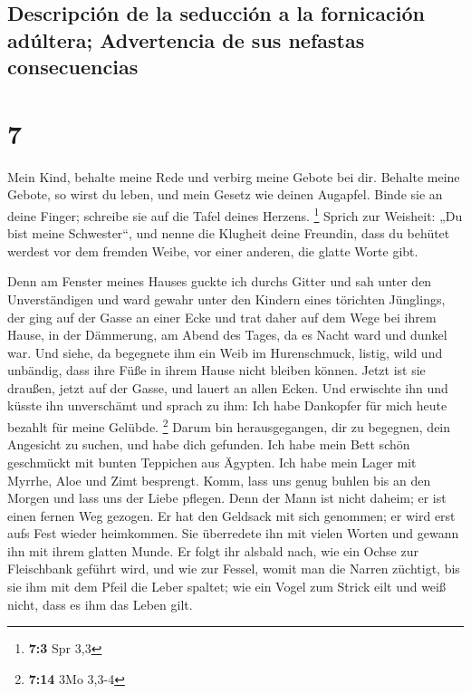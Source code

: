 \hypertarget{descripciuxf3n-de-la-seducciuxf3n-a-la-fornicaciuxf3n-aduxfaltera-advertencia-de-sus-nefastas-consecuencias}{%
\subsection{Descripción de la seducción a la fornicación adúltera;
Advertencia de sus nefastas
consecuencias}\label{descripciuxf3n-de-la-seducciuxf3n-a-la-fornicaciuxf3n-aduxfaltera-advertencia-de-sus-nefastas-consecuencias}}

\hypertarget{section-6}{%
\section{7}\label{section-6}}

 Mein Kind, behalte meine Rede und verbirg meine Gebote
bei dir.  Behalte meine Gebote, so wirst du leben, und
mein Gesetz wie deinen Augapfel.  Binde sie an deine
Finger; schreibe sie auf die Tafel deines Herzens. \footnote{\textbf{7:3}
  Spr 3,3}  Sprich zur Weisheit: „Du bist meine
Schwester``, und nenne die Klugheit deine Freundin,  dass
du behütet werdest vor dem fremden Weibe, vor einer anderen, die glatte
Worte gibt.

 Denn am Fenster meines Hauses guckte ich durchs Gitter
 und sah unter den Unverständigen und ward gewahr unter
den Kindern eines törichten Jünglings,  der ging auf der
Gasse an einer Ecke und trat daher auf dem Wege bei ihrem Hause,
 in der Dämmerung, am Abend des Tages, da es Nacht ward
und dunkel war.  Und siehe, da begegnete ihm ein Weib im
Hurenschmuck, listig,  wild und unbändig, dass ihre Füße
in ihrem Hause nicht bleiben können.  Jetzt ist sie
draußen, jetzt auf der Gasse, und lauert an allen Ecken. 
Und erwischte ihn und küsste ihn unverschämt und sprach zu ihm:
 Ich habe Dankopfer für mich heute bezahlt für meine
Gelübde. \footnote{\textbf{7:14} 3Mo 3,3-4}  Darum bin
herausgegangen, dir zu begegnen, dein Angesicht zu suchen, und habe dich
gefunden.  Ich habe mein Bett schön geschmückt mit bunten
Teppichen aus Ägypten.  Ich habe mein Lager mit Myrrhe,
Aloe und Zimt besprengt.  Komm, lass uns genug buhlen bis
an den Morgen und lass uns der Liebe pflegen.  Denn der
Mann ist nicht daheim; er ist einen fernen Weg gezogen. 
Er hat den Geldsack mit sich genommen; er wird erst aufs Fest wieder
heimkommen.  Sie überredete ihn mit vielen Worten und
gewann ihn mit ihrem glatten Munde.  Er folgt ihr alsbald
nach, wie ein Ochse zur Fleischbank geführt wird, und wie zur Fessel,
womit man die Narren züchtigt,  bis sie ihm mit dem Pfeil
die Leber spaltet; wie ein Vogel zum Strick eilt und weiß nicht, dass es
ihm das Leben gilt.

